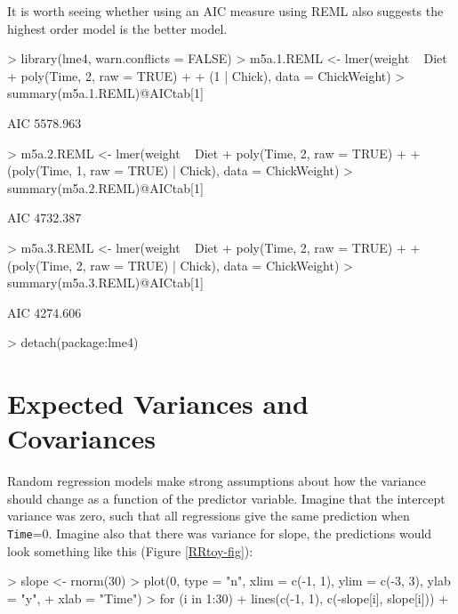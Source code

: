 \documentclass{article}
\begin{document}
It is worth seeing whether using an AIC measure using REML also suggests the highest order model is the better model. 

\begin{Schunk}
\begin{Sinput}
> library(lme4, warn.conflicts = FALSE)
> m5a.1.REML <- lmer(weight ~ Diet + poly(Time, 2, raw = TRUE) + 
+     (1 | Chick), data = ChickWeight)
> summary(m5a.1.REML)@AICtab[1]
\end{Sinput}
\begin{Soutput}
      AIC
 5578.963
\end{Soutput}
\begin{Sinput}
> m5a.2.REML <- lmer(weight ~ Diet + poly(Time, 2, raw = TRUE) + 
+     (poly(Time, 1, raw = TRUE) | Chick), data = ChickWeight)
> summary(m5a.2.REML)@AICtab[1]
\end{Sinput}
\begin{Soutput}
      AIC
 4732.387
\end{Soutput}
\begin{Sinput}
> m5a.3.REML <- lmer(weight ~ Diet + poly(Time, 2, raw = TRUE) + 
+     (poly(Time, 2, raw = TRUE) | Chick), data = ChickWeight)
> summary(m5a.3.REML)@AICtab[1]
\end{Sinput}
\begin{Soutput}
      AIC
 4274.606
\end{Soutput}
\begin{Sinput}
> detach(package:lme4)
\end{Sinput}
\end{Schunk}

\section{Expected Variances and Covariances}

Random regression models make strong assumptions about how the variance should change as a function of the predictor variable. Imagine that the intercept variance was zero, such that all regressions give the same prediction when \texttt{Time}=0. Imagine also that there was variance for slope, the predictions would look something like this (Figure \ref{RRtoy-fig}):

\begin{Schunk}
\begin{Sinput}
> slope <- rnorm(30)
> plot(0, type = "n", xlim = c(-1, 1), ylim = c(-3, 3), ylab = "y", 
+     xlab = "Time")
> for (i in 1:30) {
+     lines(c(-1, 1), c(-slope[i], slope[i]))
+ }
\end{Sinput}
\end{Schunk}
\end{document}
